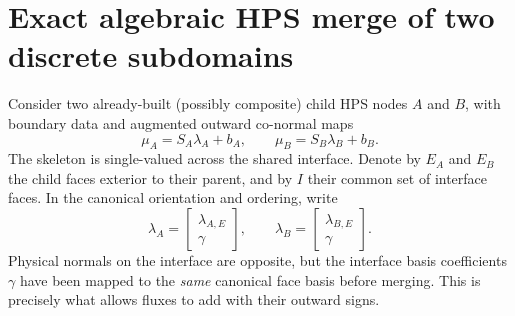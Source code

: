 \documentclass[11pt]{article}
\begin{document}
\section{Exact algebraic HPS merge of two discrete subdomains}
\label{sec:full_merge}

Consider two already-built (possibly composite) child HPS nodes
$A$ and $B$, with boundary data and augmented outward co-normal maps
\begin{equation}\label{eq:full_two_children}
 \mu_A=S_A\lambda_A+b_A,\qquad
 \mu_B=S_B\lambda_B+b_B.
\end{equation}
The skeleton is single-valued across the shared interface.  Denote
by $E_A$ and $E_B$ the child faces exterior to their parent, and by
$I$ their common set of interface faces.  In the canonical orientation
and ordering, write
\begin{equation}\label{eq:full_child_traces}
 \lambda_A=\begin{bmatrix}\lambda_{A,E}\\\gamma\end{bmatrix},
 \qquad
 \lambda_B=\begin{bmatrix}\lambda_{B,E}\\\gamma\end{bmatrix}.
\end{equation}
Physical normals on the interface are opposite, but the interface
basis coefficients $\gamma$ have been mapped to the \emph{same}
canonical face basis before merging.  This is precisely what allows
fluxes to add with their outward signs.
\end{document}
